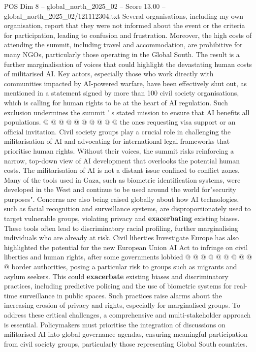 \begin{textsample}{POS Dim 8 – global\_north\_2025\_02 – Score 13.00 – global\_north\_2025\_02/121112304.txt}
Several organisations, including my own organisation, report that they were not informed about the event or the criteria for participation, leading to confusion and frustration.
Moreover, the high costs of attending the summit, including travel and accommodation, are prohibitive for many NGOs, particularly those operating in the Global South.
The result is a further marginalisation of voices that could highlight the devastating human costs of militarised AI.
Key actors, especially those who work directly with communities impacted by AI-powered warfare, have been effectively shut out, as mentioned in a statement signed by more than 100 civil society organisations, which is calling for human rights to be at the heart of AI regulation.
Such exclusion undermines the summit ' s stated mission to ensure that AI benefits all populations. @ @ @ @ @ @ @ @ @ @ the ones requesting visa support or an official invitation.
Civil society groups play a crucial role in challenging the militarisation of AI and advocating for international legal frameworks that prioritise human rights.
Without their voices, the summit risks reinforcing a narrow, top-down view of AI development that overlooks the potential human costs.
The militarisation of AI is not a distant issue confined to conflict zones.
Many of the tools used in Gaza, such as biometric identification systems, were developed in the West and continue to be used around the world for"security purposes".
Concerns are also being raised globally about how AI technologies, such as facial recognition and surveillance systems, are disproportionately used to target vulnerable groups, violating privacy and \textbf{exacerbating} existing biases.
These tools often lead to discriminatory racial profiling, further marginalising individuals who are already at risk.
Civil liberties Investigate Europe has also highlighted the potential for the new European Union AI Act to infringe on civil liberties and human rights, after some governments lobbied @ @ @ @ @ @ @ @ @ @ border authorities, posing a particular risk to groups such as migrants and asylum seekers.
This could \textbf{exacerbate} existing biases and discriminatory practices, including predictive policing and the use of biometric systems for real-time surveillance in public spaces.
Such practices raise alarms about the increasing erosion of privacy and rights, especially for marginalised groups.
To address these critical challenges, a comprehensive and multi-stakeholder approach is essential.
Policymakers must prioritise the integration of discussions on militarised AI into global governance agendas, ensuring meaningful participation from civil society groups, particularly those representing Global South countries.

\end{textsample}
